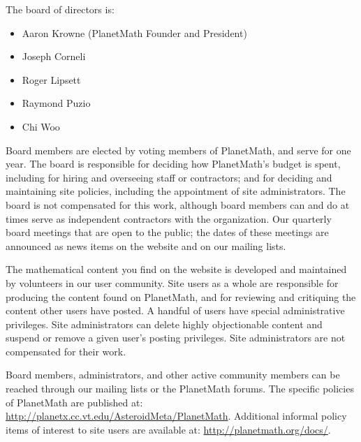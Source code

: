 
The board of directors is:
\begin{itemize}
\item Aaron Krowne (PlanetMath Founder and President)
\item Joseph Corneli
\item Roger Lipsett
\item Raymond Puzio
\item Chi Woo
\end{itemize}

Board members are elected by voting members of PlanetMath, and serve for one
year. The board is responsible for deciding how PlanetMath's budget is spent,
including for hiring and overseeing staff or contractors; and for deciding and
maintaining site policies, including the appointment of site administrators.
The board is not compensated for this work, although board members can and do
at times serve as independent contractors with the organization. Our quarterly
board meetings that are open to the public; the dates of these meetings are
announced as news items on the website and on our mailing lists.

The mathematical content you find on the website is developed and maintained by
volunteers in our user community. Site users as a whole are responsible for
producing the content found on PlanetMath, and for reviewing and critiquing the
content other users have posted. A handful of users have special administrative
privileges. Site administrators can delete highly objectionable content and
suspend or remove a given user's posting privileges. Site administrators are
not compensated for their work.

Board members, administrators, and other active community members can be
reached through our mailing lists or the PlanetMath forums. The specific
policies of PlanetMath are published at:
\url{http://planetx.cc.vt.edu/AsteroidMeta/PlanetMath}.
Additional informal policy items of interest to site users are
available at: \url{http://planetmath.org/docs/}.
